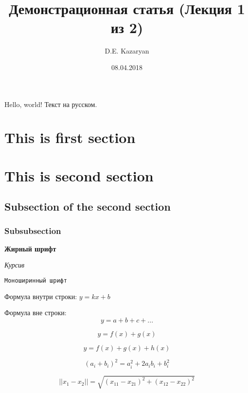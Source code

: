 \documentclass[a4paper,12pt]{article}
\title{Демонстрационная статья (Лекция 1 из 2)}
\date{08.04.2018}
\author{D.E. Kazaryan}
\begin{document}
\maketitle


Hello, world! Текст на русском.

\section{This is first section}

\section{This is second section}

\subsection{Subsection of the second section}

\subsubsection{Subsubsection}

\textbf{Жирный шрифт}

\textit{Курсив}

\texttt{Моноширинный шрифт}

Формула внутри строки: $y=kx+b$

Формула вне строки: $$y=a+b+c+...$$

\begin{equation}
    y = f(x) + g(x)
\end{equation}

\begin{equation*}
    y = f(x) + g(x) + h(x)
\end{equation*}

\begin{equation}
    (a_i+b_i)^2 = a_i^2 + 2 a_i b_i + b_i^2
\end{equation}

\begin{equation}
    ||x_1 - x_2|| = \sqrt{(x_{11} - x_{21})^2 + (x_{12} - x_{22})^2}
\end{equation}
\end{document}
